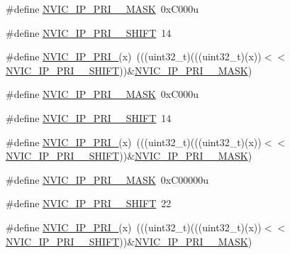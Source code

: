 \begin{DoxyCompactItemize}
\item 
\#define \hyperlink{group___n_v_i_c___register___masks_gab5fb432f1775a7bf1f198328f66009d3}{N\+V\+I\+C\+\_\+\+I\+P\+\_\+\+P\+R\+I\+\_\+\_\+\+M\+A\+SK}~0x\+C000u
\item 
\#define \hyperlink{group___n_v_i_c___register___masks_ga9ee6ca77dddd98a4fa7e773cdec250fa}{N\+V\+I\+C\+\_\+\+I\+P\+\_\+\+P\+R\+I\+\_\+\_\+\+S\+H\+I\+FT}~14
\item 
\#define \hyperlink{group___n_v_i_c___register___masks_gaafba80f86264d7b1e9a5b1e0fe6d1a24}{N\+V\+I\+C\+\_\+\+I\+P\+\_\+\+P\+R\+I\+\_}(x)~(((uint32\+\_\+t)(((uint32\+\_\+t)(x))$<$$<$\hyperlink{group___n_v_i_c___register___masks_ga9ee6ca77dddd98a4fa7e773cdec250fa}{N\+V\+I\+C\+\_\+\+I\+P\+\_\+\+P\+R\+I\+\_\+\_\+\+S\+H\+I\+FT}))\&\hyperlink{group___n_v_i_c___register___masks_gab5fb432f1775a7bf1f198328f66009d3}{N\+V\+I\+C\+\_\+\+I\+P\+\_\+\+P\+R\+I\+\_\+\_\+\+M\+A\+SK})
\item 
\#define \hyperlink{group___n_v_i_c___register___masks_ga480e53d7e2d091174c03809cbbea3b68}{N\+V\+I\+C\+\_\+\+I\+P\+\_\+\+P\+R\+I\+\_\+\_\+\+M\+A\+SK}~0x\+C000u
\item 
\#define \hyperlink{group___n_v_i_c___register___masks_ga14b2c9a7ea14a343605d020edd9f186a}{N\+V\+I\+C\+\_\+\+I\+P\+\_\+\+P\+R\+I\+\_\+\_\+\+S\+H\+I\+FT}~14
\item 
\#define \hyperlink{group___n_v_i_c___register___masks_ga8067ec472d887da2e51f5abdd433d7fb}{N\+V\+I\+C\+\_\+\+I\+P\+\_\+\+P\+R\+I\+\_}(x)~(((uint32\+\_\+t)(((uint32\+\_\+t)(x))$<$$<$\hyperlink{group___n_v_i_c___register___masks_ga14b2c9a7ea14a343605d020edd9f186a}{N\+V\+I\+C\+\_\+\+I\+P\+\_\+\+P\+R\+I\+\_\+\_\+\+S\+H\+I\+FT}))\&\hyperlink{group___n_v_i_c___register___masks_ga480e53d7e2d091174c03809cbbea3b68}{N\+V\+I\+C\+\_\+\+I\+P\+\_\+\+P\+R\+I\+\_\+\_\+\+M\+A\+SK})
\item 
\#define \hyperlink{group___n_v_i_c___register___masks_ga020ccac56651e055f659cbcc0387d0b2}{N\+V\+I\+C\+\_\+\+I\+P\+\_\+\+P\+R\+I\+\_\+\_\+\+M\+A\+SK}~0x\+C00000u
\item 
\#define \hyperlink{group___n_v_i_c___register___masks_ga9ecbd3ab4a0623c8001df6917c2764b2}{N\+V\+I\+C\+\_\+\+I\+P\+\_\+\+P\+R\+I\+\_\+\_\+\+S\+H\+I\+FT}~22
\item 
\#define \hyperlink{group___n_v_i_c___register___masks_gaaf8fe41995f4de6e7581515387b1bd91}{N\+V\+I\+C\+\_\+\+I\+P\+\_\+\+P\+R\+I\+\_}(x)~(((uint32\+\_\+t)(((uint32\+\_\+t)(x))$<$$<$\hyperlink{group___n_v_i_c___register___masks_ga9ecbd3ab4a0623c8001df6917c2764b2}{N\+V\+I\+C\+\_\+\+I\+P\+\_\+\+P\+R\+I\+\_\+\_\+\+S\+H\+I\+FT}))\&\hyperlink{group___n_v_i_c___register___masks_ga020ccac56651e055f659cbcc0387d0b2}{N\+V\+I\+C\+\_\+\+I\+P\+\_\+\+P\+R\+I\+\_\+\_\+\+M\+A\+SK})
$$
\end{DoxyCompactItemize}
